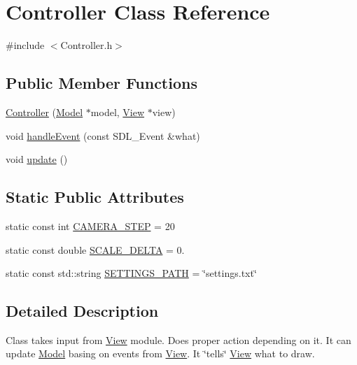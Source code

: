 \hypertarget{class_controller}{}\section{Controller Class Reference}
\label{class_controller}


{\ttfamily \#include $<$Controller.\+h$>$}

\subsection*{Public Member Functions}
\begin{DoxyCompactItemize}
\item 
\hyperlink{class_controller_acc4691a24b53d965c0728d754d02f8d1}{Controller} (\hyperlink{class_model}{Model} $\ast$model, \hyperlink{class_view}{View} $\ast$view)
\item 
void \hyperlink{class_controller_a52366215054a845cbc38ed5ab6a96168}{handle\+Event} (const S\+D\+L\+\_\+\+Event \&what)
\item 
void \hyperlink{class_controller_a7d04c17913f04f99429aa29fa8505484}{update} ()
\end{DoxyCompactItemize}
\subsection*{Static Public Attributes}
\begin{DoxyCompactItemize}
\item 
static const int \hyperlink{class_controller_a780915afe4b18974d43a3bcc37191fa3}{C\+A\+M\+E\+R\+A\+\_\+\+S\+T\+E\+P} = 20
\item 
static const double \hyperlink{class_controller_aebc8c6a5a61745f766ec282bee504ec4}{S\+C\+A\+L\+E\+\_\+\+D\+E\+L\+T\+A} = 0.
\item 
static const std\+::string \hyperlink{class_controller_a8750bb269d145654c359c8a4acb50259}{S\+E\+T\+T\+I\+N\+G\+S\+\_\+\+P\+A\+T\+H} = \char`\"{}settings.\+txt\char`\"{}
\end{DoxyCompactItemize}


\subsection{Detailed Description}
Class takes input from \hyperlink{class_view}{View} module. Does proper action depending on it. It can update \hyperlink{class_model}{Model} basing on events from \hyperlink{class_view}{View}. It \char`\"{}tells\char`\"{} \hyperlink{class_view}{View} what to draw. 

